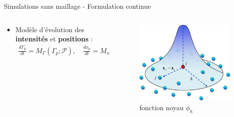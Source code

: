 \documentclass[aspectratio=169]{beamer} %
\begin{document}
\begin{frame}{Simulations sans maillage - Formulation continue}
\begin{columns}[t]
\begin{column}{0.7\textwidth}
\begin{itemize}
                \item Modèle d'évolution des \textbf{intensités} et \textbf{positions} :
                      \begin{eqnarray*}
                          \frac{d\Gamma_p}{dt} = M_\Gamma(\Gamma_p; \mathcal P), \quad \frac{d x_p}{d t} = M_x(x_p; \mathcal P)
                      \end{eqnarray*}
            \end{itemize}
        \end{column}
        \begin{column}{0.3\textwidth}
            \begin{figure}
                \includegraphics[width=\textwidth]{../../conference/images/kernel.png}
                \caption*{fonction noyau $\phi_h$}
            \end{figure}
        \end{column}
    \end{columns}
\end{frame}
\end{document}
